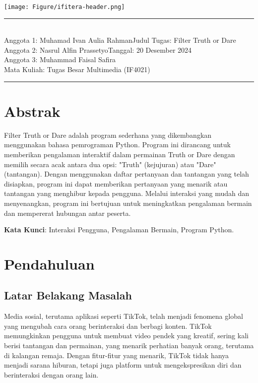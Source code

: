 \documentclass[11pt,a4paper]{article}
\newcommand{\studentone}{Muhamad Ivan Aulia Rahman}
\newcommand{\studenttwo}{Nasrul Alfin Prassetyo}
\newcommand{\studentthree}{Muhammad Faisal Safira}
\newcommand{\course}{Tugas Besar Multimedia (IF4021)}
\newcommand{\assignment}{Filter Truth or Dare}
\begin{document}
\thispagestyle{empty}
\begin{center}
    \texttt{[image: Figure/ifitera-header.png]}
    \vspace{0.1cm}
\end{center}
\noindent
\rule{17cm}{0.2cm}\\[0.3cm]
Anggota 1: \studentone \hfill Judul Tugas: \assignment\\[0.1cm]
Anggota 2: \studenttwo \hfill Tanggal: 20 Desember 2024\\[0.1cm]
Anggota 3: \studentthree \hfill\\[0.1cm]
Mata Kuliah: \course \hfill\\[0.1cm]
\rule{17cm}{0.05cm}
\vspace{0.1cm}

\section*{Abstrak}
Filter Truth or Dare adalah program sederhana yang dikembangkan menggunakan bahasa pemrograman Python. Program ini dirancang untuk memberikan pengalaman interaktif dalam permainan Truth or Dare dengan memilih secara acak antara dua opsi: "Truth" (kejujuran) atau "Dare" (tantangan). Dengan menggunakan daftar pertanyaan dan tantangan yang telah disiapkan, program ini dapat memberikan pertanyaan yang menarik atau tantangan yang menghibur kepada pengguna. Melalui interaksi yang mudah dan menyenangkan, program ini bertujuan untuk meningkatkan pengalaman bermain dan mempererat hubungan antar peserta.

\textbf{Kata Kunci}: Interaksi Pengguna, Pengalaman Bermain, Program Python.

\newpage

\tableofcontents
\newpage

\section{Pendahuluan}
\subsection{Latar Belakang Masalah}

Media sosial, terutama aplikasi seperti TikTok, telah menjadi fenomena global yang mengubah cara orang berinteraksi dan berbagi konten. TikTok memungkinkan pengguna untuk membuat video pendek yang kreatif, sering kali berisi tantangan dan permainan, yang menarik perhatian banyak orang, terutama di kalangan remaja. Dengan fitur-fitur yang menarik, TikTok tidak hanya menjadi sarana hiburan, tetapi juga platform untuk mengekspresikan diri dan berinteraksi dengan orang lain.
\end{document}
